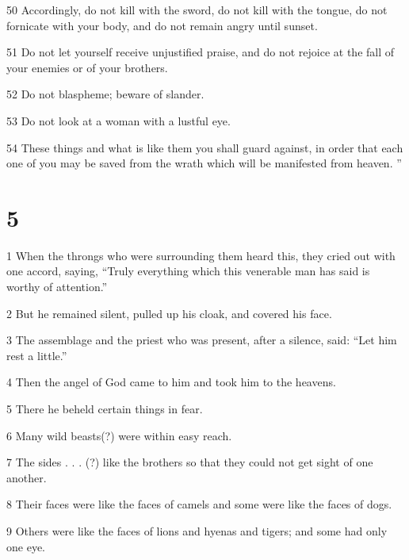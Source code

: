 \par 50 Accordingly, do not kill with the sword, do not kill with the tongue, do not fornicate with your body, and do not remain angry until sunset. 

\par 51 Do not let yourself receive unjustified praise, and do not rejoice at the fall of your enemies or of your brothers. 

\par 52 Do not blaspheme; beware of slander. 

\par 53 Do not look at a woman with a lustful eye. 

\par 54 These things and what is like them you shall guard against, in order that each one of you may be saved from the wrath which will be manifested from heaven. ”

\chapter{5}

\par 1 When the throngs who were surrounding them heard this, they cried out with one accord, saying, “Truly everything which this venerable man has said is worthy of attention.” 

\par 2 But he remained silent, pulled up his cloak, and covered his face. 

\par 3 The assemblage and the priest who was present, after a silence, said: “Let him rest a little.” 

\par 4 Then the angel of God came to him and took him to the heavens. 

\par 5 There he beheld certain things in fear. 

\par 6 Many wild beasts(?) were within easy reach. 

\par 7 The sides . . . (?) like the brothers so that they could not get sight of one another.

\par 8 Their faces were like the faces of camels and some were like the faces of dogs. 

\par 9 Others were like the faces of lions and hyenas and tigers; and some had only one eye. 


